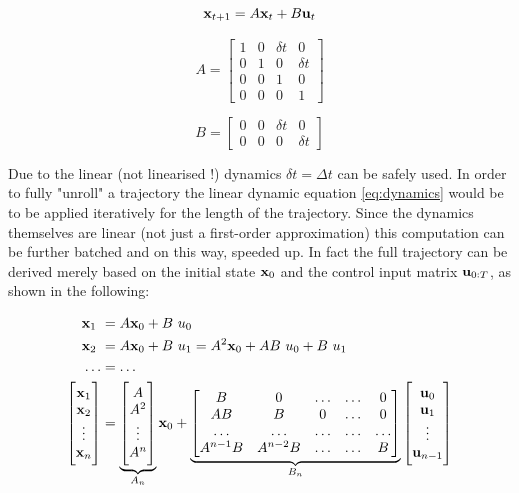 \begin{equation}
\mathbf{x}_{t+1} = A \mathbf{x}_t + B \mathbf{u}_t
\label{eq:dynamics}
\end{equation}

\begin{minipage}{0.5\textwidth}
$$A = \begin{bmatrix} 1 & 0 & \delta t & 0 \\ 0 & 1 & 0 & \delta t \\ 0 & 0 & 1 & 0 \\ 0 & 0 & 0 & 1\end{bmatrix}$$
\end{minipage}
\begin{minipage}{0.5\textwidth}
$$B = \begin{bmatrix} 0 & 0 & \delta t & 0 \\ 0 & 0 & 0 & \delta t \end{bmatrix}$$
\end{minipage}

Due to the linear (not linearised !) dynamics $\delta t = \Delta t$ can be safely used. In order to fully "unroll" a trajectory the linear dynamic equation \ref{eq:dynamics} would be to be applied iteratively for the length of the trajectory. Since the dynamics themselves are linear (not just a first-order approximation) this computation can be further batched and on this way, speeded up. In fact the full trajectory can be derived merely based on the initial state $\mathbf{x}_0$ and the control input matrix $\mathbf{u}_{0:T}$, as shown in the following:

\begin{align}
\x_1 &= A \x_0 + B \ u_0 \\
\x_2 &= A \x_0 + B \ u_1 = A^2 \x_0 + A B \ u_0 + B \ u_1\\ 
\hdots &= \hdots \\
\begin{bmatrix} \x_1 \\ \x_2 \\ \vdots \\ \x_n \end{bmatrix} &= \underbrace{\begin{bmatrix} A \\ A^2 \\ \vdots \\ A^n \end{bmatrix}}_{\substack{A_n}} \x_0 + \underbrace{\begin{bmatrix} B & 0 & \hdots & \hdots & 0 \\ AB & B & 0 & \hdots & 0 \\ \hdots & \hdots & \hdots & \hdots & \hdots \\ A^{n-1} B & A^{n-2} B & \hdots & \hdots & B \end{bmatrix}}_{\substack{B_n}} \begin{bmatrix} \u_0 \\ \u_1 \\ \vdots \\ \u_{n-1} \end{bmatrix}
\end{align}

